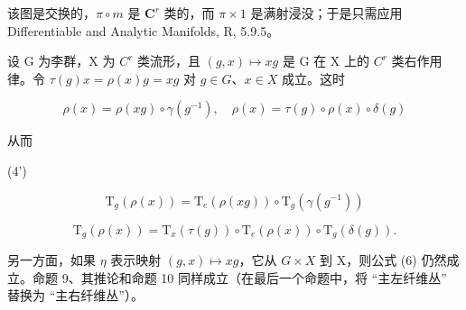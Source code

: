 该图是交换的，\(\pi \circ m\) 是 \(\mathbf{C}^r\) 类的，而 \(\pi \times 1\) 是满射浸没；于是只需应用 Differentiable and Analytic Manifolds, R, 5.9.5。

设 G 为李群，X 为 \(C^{r}\) 类流形，且 \((g, x) \mapsto xg\) 是 G 在 X 上的 \(C^{r}\) 类右作用律。令 \(\tau(g)x = \rho(x)g = xg\) 对 \(g \in G\)、\(x \in X\) 成立。这时

\[
\rho (x) = \rho (x g) \circ \gamma (g ^ {- 1}), \quad \rho (x) = \tau (g) \circ \rho (x) \circ \delta (g)\tag{3'}
\]

从而

(4')

\[
\mathrm{T} _ {g} (\rho (x)) = \mathrm{T} _ {e} (\rho (x g)) \circ \mathrm{T} _ {g} (\gamma (g ^ {- 1}))\tag{5'}
\]

\[
\mathrm{T} _ {g} (\rho (x)) = \mathrm{T} _ {x} (\tau (g)) \circ \mathrm{T} _ {e} (\rho (x)) \circ \mathrm{T} _ {g} (\delta (g)).
\]

另一方面，如果 \(\eta\) 表示映射 \((g, x) \mapsto xg\)，它从 \(G \times X\) 到 X，则公式 (6) 仍然成立。命题 9、其推论和命题 10 同样成立（在最后一个命题中，将 ``主左纤维丛'' 替换为 ``主右纤维丛''）。

